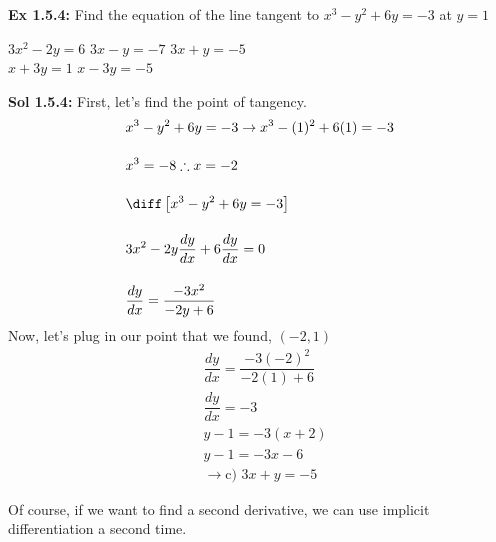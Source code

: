 \begin{tcolorbox}[example]
    \textbf{Ex 1.5.4: } Find the equation of the line tangent to $x^3 - y^2 + 6y = -3$ at $y = 1$ \\

    \begin{oneparchoices}
        \choice $3x^2 - 2y = 6$ 
        \choice $3x - y = -7$
        \choice $3x + y = -5$ \\[11pt]
        \makebox[0.25\textwidth] \choice $x + 3y = 1$
        \makebox[0.27\textwidth] \choice $x - 3y = -5$
    \end{oneparchoices}
\end{tcolorbox}
\begin{tcolorbox}[solution]
    \textbf{Sol 1.5.4: } First, let's find the point of tangency. \begin{align*}
        & x^3 - y^2 + 6y = -3 \rightarrow x^3 - (1)^2 + 6(1) = -3 \\[11pt]
        & x^3 = -8 \therefore x = -2 \\[11pt]
        & \diff \left[x^3 - y^2 + 6y = -3\right] \\[11pt]
        & 3x^2 - 2y\dfrac{dy}{dx} + 6\dfrac{dy}{dx} = 0 \\[11pt]
        & \dfrac{dy}{dx} = \dfrac{-3x^2}{-2y + 6}
    \end{align*}
    Now, let's plug in our point that we found, $(-2, 1)$ \begin{align*}
        & \dfrac{dy}{dx} = \dfrac{-3(-2)^2}{-2(1) + 6} \\[11pt]
        & \dfrac{dy}{dx} = -3 \\[11pt]
        & y - 1 = -3(x + 2) \\[11pt]
        & y - 1 = -3x - 6 \\[11pt]
        & \rightarrow \boxed{\text{c) } 3x + y = -5}
    \end{align*}
\end{tcolorbox}

Of course, if we want to find a second derivative, we can use implicit differentiation a second time. \par 


